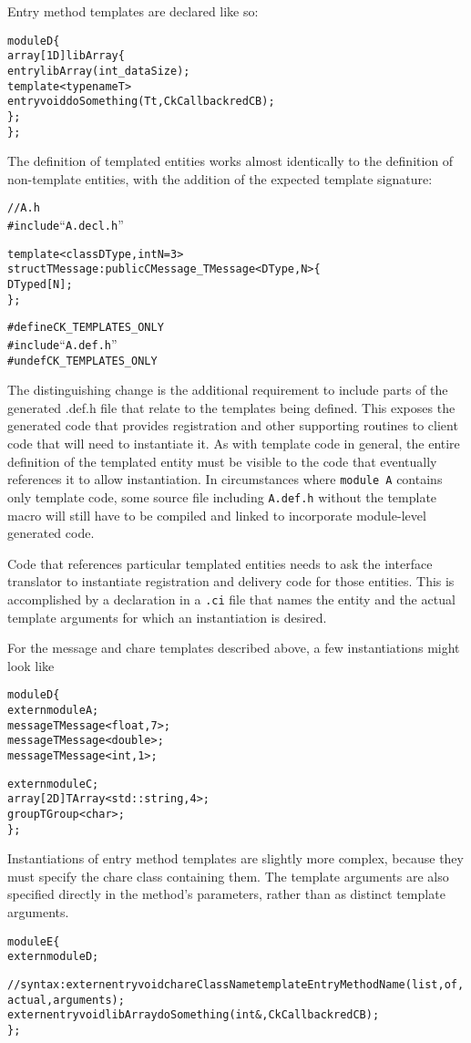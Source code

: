 Entry method templates are declared like so:
\begin{alltt}
module D \{
    array [1D] libArray \{
        entry libArray(int _dataSize);
        template <typename T>
        entry void doSomething(T t, CkCallback redCB);
    \};
\};
\end{alltt}


The definition of templated \charmpp entities works almost identically to the
definition of non-template entities, with the addition of the expected template
signature:
\begin{alltt}
// A.h
#include ``A.decl.h''

template <class DType, int N=3>
struct TMessage : public CMessage_TMessage<DType, N> \{
  DType d[N];
\};

#define CK_TEMPLATES_ONLY
#include ``A.def.h''
#undef CK_TEMPLATES_ONLY
\end{alltt}
The distinguishing change is the additional requirement to include parts of the
generated .def.h file that relate to the templates being defined. This exposes
the generated code that provides registration and other supporting routines to
client code that will need to instantiate it. As with \CC template code in
general, the entire definition of the templated entity must be visible to the
code that eventually references it to allow instantiation. In circumstances
where {\tt module A} contains only template code, some source file including
{\tt A.def.h} without the template macro will still have to be compiled and
linked to incorporate module-level generated code.


Code that references particular templated entities needs to ask the interface
translator to instantiate registration and delivery code for those
entities. This is accomplished by a declaration in a {\tt .ci} file that names
the entity and the actual template arguments for which an instantiation is
desired.

For the message and chare templates described above, a few instantiations might
look like
\begin{alltt}
module D \{
  extern module A;
  message TMessage<float, 7>;
  message TMessage<double>;
  message TMessage<int, 1>;

  extern module C;
  array [2D] TArray<std::string, 4>;
  group TGroup<char>;
\};
\end{alltt}

Instantiations of entry method templates are slightly more complex, because
they must specify the chare class containing them. The template arguments are
also specified directly in the method's parameters, rather than as distinct
template arguments.
\begin{alltt}
module E \{
  extern module D;

  // syntax: extern entry void chareClassName templateEntryMethodName(list, of, actual, arguments);
  extern entry void libArray doSomething(int&, CkCallback redCB);
\};
\end{alltt}
